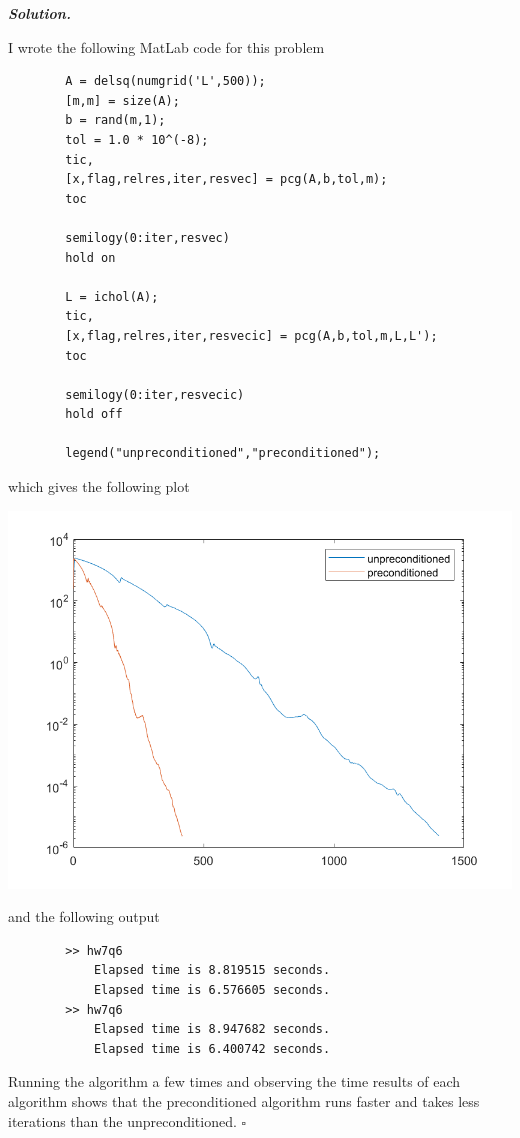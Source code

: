 \documentclass[12pt]{report}
\newenvironment{solution}[1][\it{Solution}]{\textbf{#1. } }{$\square$}
\begin{document}
\begin{solution}
    
    I wrote the following MatLab code for this problem
    \begin{verbatim}
        A = delsq(numgrid('L',500));
        [m,m] = size(A);
        b = rand(m,1);
        tol = 1.0 * 10^(-8);
        tic, 
        [x,flag,relres,iter,resvec] = pcg(A,b,tol,m); 
        toc

        semilogy(0:iter,resvec)
        hold on

        L = ichol(A);
        tic,
        [x,flag,relres,iter,resvecic] = pcg(A,b,tol,m,L,L');
        toc

        semilogy(0:iter,resvecic)
        hold off

        legend("unpreconditioned","preconditioned");
    \end{verbatim}
    which gives the following plot
    \begin{center}
        \includegraphics[width=.6\textwidth]{plots/6-1.png}
    \end{center}
    and the following output
    \begin{verbatim}
        >> hw7q6
            Elapsed time is 8.819515 seconds.
            Elapsed time is 6.576605 seconds.
        >> hw7q6
            Elapsed time is 8.947682 seconds.
            Elapsed time is 6.400742 seconds.
    \end{verbatim}
    Running the algorithm a few times and observing the time results of each algorithm shows that the preconditioned algorithm runs faster and takes less iterations than the unpreconditioned.
\end{solution}

\newpage
\end{document}
